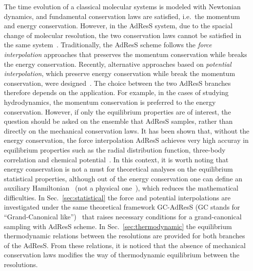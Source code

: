 \documentclass[epjST]{svjour}
\newcommand{\recheck}[1]{{\color{red} #1}}
\begin{document}
The time evolution of a classical molecular systems
is modeled with Newtonian dynamics, and fundamental conservation laws
are satisfied, i.e.~the momentum and energy conservation.
However, in the AdResS system,
due to the spacial change of molecular resolution,
the two conservation laws cannot be satisfied in the same system~\cite{praprotnik2011comment,dellesite2007some}.
Traditionally, the AdResS scheme follows the \emph{force interpolation} approaches
that preserves the momentum conservation while breaks the energy
conservation.
Recently,
alternative approaches based on \emph{potential interpolation},
which preserve energy conservation while break the momentum conservation,
were designed~\cite{wang2013grand,potestio2013hamiltonian}.
The choice between the two AdResS branches therefore depends on the application. For example, in the
cases of studying hydrodynamics, the momentum conservation is preferred to the energy conservation.
However, if only the equilibrium properties are of interest,
the question should be asked on the ensemble that AdResS samples,
rather than directly on the mechanical conservation laws.
\recheck{It has been shown that, without the energy conservation, the force interpolation AdResS achieves
very high accuray in equilibrium properties such as the radial distribution function, three-body correlation and chemical potential~\cite{wang2013grand}.}
In this context,
it is worth noting that energy conservation is not a must for theoretical analyses on the equilibrium statistical properties,
although out of the energy conservation
one can define an auxiliary Hamiltonian~\cite{wang2013grand,agarwal2014chemical}
(not a physical one~\cite{dellesite2013multiscale}),
which reduces the mathematical difficulties.
In Sec.~\ref{sec:statistical} the force and potential interpolations are investigated 
under the same theoretical framework GC-AdResS (GC stands for ``Grand-Canonical like'')~\cite{wang2013grand} that raises necessary conditions
for a grand-canonical sampling with AdResS scheme.
In Sec.~\ref{sec:thermodynamic} the equilibrium thermodynamic relations between the resolutions are
provided for both branches of the AdResS.
From these relations, it is noticed that the absence of mechanical conservation laws 
modifies the way of thermodynamic equilibrium between the resolutions.
\end{document}
